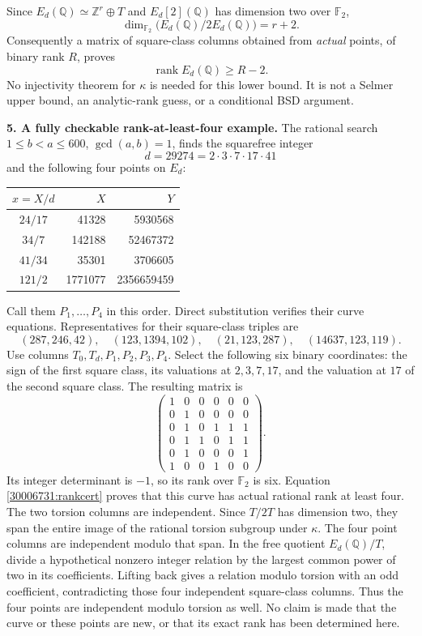 \documentclass[11pt,a4paper]{article}
\newcommand{\Z}{\mathbb{Z}}
\newcommand{\Q}{\mathbb{Q}}
\numberwithin{equation}{section}
\begin{document}
Since $E_d(\Q)\simeq\Z^r\oplus T$ and $E_d[2](\Q)$ has dimension two over
$\mathbb F_2$,
\[
 \dim_{\mathbb F_2}\bigl(E_d(\Q)/2E_d(\Q)\bigr)=r+2.
\]
Consequently a matrix of square-class columns obtained from \emph{actual}
points, of binary rank $R$, proves
\begin{equation}\label{30006731:rankcert}
 \operatorname{rank}E_d(\Q)\geq R-2.
\end{equation}
No injectivity theorem for $\kappa$ is needed for this lower bound. It is not
a Selmer upper bound, an analytic-rank guess, or a conditional BSD argument.

\medskip
\textbf{5. A fully checkable rank-at-least-four example.}
The rational search $1\leq b<a\leq600$, $\gcd(a,b)=1$, finds the squarefree
integer
\[
 d=29274=2\cdot3\cdot7\cdot17\cdot41
\]
and the following four points on $E_d$:
\begin{center}
\begin{tabular}{c|r|r}
$x=X/d$ & $X$ & $Y$\\\hline
$24/17$ & 41328 & 5930568\\
$34/7$ & 142188 & 52467372\\
$41/34$ & 35301 & 3706605\\
$121/2$ & 1771077 & 2356659459
\end{tabular}
\end{center}
Call them $P_1,\ldots,P_4$ in this order. Direct substitution verifies their
curve equations. Representatives for their square-class triples are
\[
 (287,246,42),\quad (123,1394,102),\quad
 (21,123,287),\quad (14637,123,119).
\]
Use columns $T_0,T_d,P_1,P_2,P_3,P_4$. Select the following six binary
coordinates: the sign of the first square class, its valuations at
$2,3,7,17$, and the valuation at $17$ of the second square class. The
resulting matrix is
\begin{equation}\label{30006731:matrix}
 \begin{pmatrix}
 1&0&0&0&0&0\\
 0&1&0&0&0&0\\
 0&1&0&1&1&1\\
 0&1&1&0&1&1\\
 0&1&0&0&0&1\\
 1&0&0&1&0&0
 \end{pmatrix}.
\end{equation}
Its integer determinant is $-1$, so its rank over $\mathbb F_2$ is six.
Equation \eqref{30006731:rankcert} proves that this curve has actual rational
rank at least four. The two torsion columns are independent. Since $T/2T$ has dimension two,
they span the entire image of the rational torsion subgroup under $\kappa$.
The four point columns are independent modulo that span. In the free
quotient $E_d(\Q)/T$, divide a hypothetical nonzero integer relation by
the largest common power of two in its coefficients. Lifting back gives a
relation modulo torsion with an odd coefficient, contradicting those four
independent square-class columns. Thus the four points are independent
modulo torsion as well. No claim is made that the curve or
these points are new, or that its exact rank has been determined here.
\end{document}
